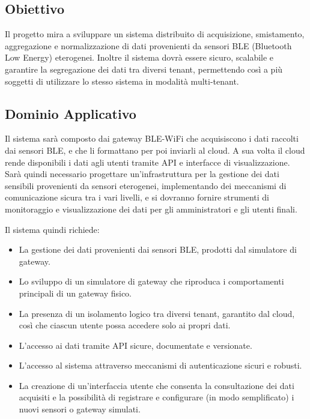 \documentclass[a4paper,12pt]{article}
\begin{document}
    \subsection{Obiettivo}
    Il progetto mira a sviluppare un sistema distribuito di acquisizione, smistamento, aggregazione e normalizzazione di dati provenienti da sensori BLE (Bluetooth Low Energy) eterogenei. Inoltre il sistema dovrà essere sicuro, scalabile e garantire la segregazione dei dati tra diversi tenant, permettendo così a più soggetti di utilizzare lo stesso sistema in modalità multi-tenant.
    \subsection{Dominio Applicativo}
    Il sistema sarà composto dai gateway BLE-WiFi che acquisiscono i dati raccolti dai sensori BLE, e che li formattano per poi inviarli al cloud. A sua volta il cloud rende disponibili i dati agli utenti tramite API e interfacce di visualizzazione. Sarà quindi necessario progettare un’infrastruttura per la gestione dei dati sensibili provenienti da sensori eterogenei, implementando dei meccanismi di comunicazione sicura tra i vari livelli, e si dovranno fornire strumenti di monitoraggio e visualizzazione dei dati per gli amministratori e gli utenti finali.
    
    Il sistema quindi richiede:
    \begin{itemize}
		\item La gestione dei dati provenienti dai sensori BLE, prodotti dal simulatore di gateway.
		\item Lo sviluppo di un simulatore di gateway che riproduca i comportamenti principali di un gateway fisico.
		\item La presenza di un isolamento logico tra diversi tenant, garantito dal cloud, così che ciascun utente possa accedere solo ai propri dati.
		\item L’accesso ai dati tramite API sicure, documentate e versionate.
		\item L’accesso al sistema attraverso meccanismi di autenticazione sicuri e robusti.
		\item La creazione di un’interfaccia utente che consenta la consultazione dei dati acquisiti e la possibilità di registrare e configurare (in modo semplificato) i nuovi sensori o gateway simulati.
    \end{itemize}
\end{document}
